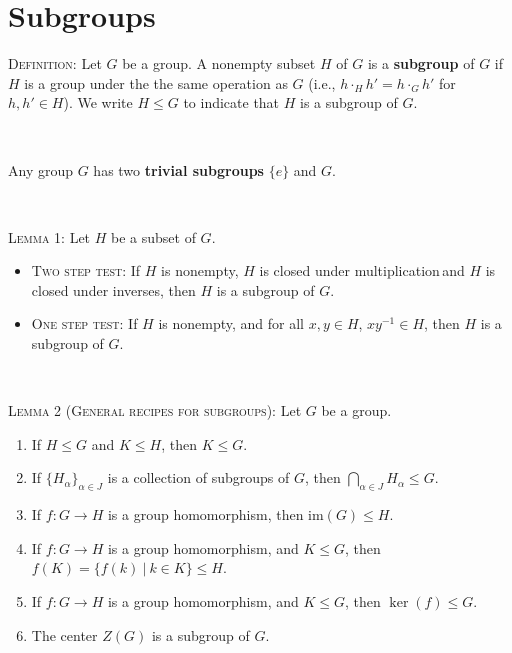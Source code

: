\documentclass[12pt]{amsart}
\newcommand{\showsol}[1]{\def\displaysol{#1}}
\begin{document}
\showsol{0}
	
	\thispagestyle{empty}
	
	\section*{Subgroups}
	
	

\begin{framed}

\textsc{Definition:} Let $G$ be a group. A nonempty subset $H$ of $G$ is a \textbf{subgroup} of $G$ if $H$ is a group under the the same operation as $G$  (i.e., $h \cdot_H h' = h \cdot_G h'$ for $h,h'\in H$). We write $H\leq G$ to indicate that $H$ is a subgroup of $G$.

\

Any group $G$ has two \textbf{trivial subgroups} $\{e\}$ and $G$.

\

\textsc{Lemma 1:} Let $H$ be a subset of $G$.
\begin{itemize}
\item \textsc{Two step test:} If $H$ is nonempty, $H$ is closed under multiplication\footnotemark\,and $H$ is closed under inverses\footnotemark[1], then $H$ is a subgroup of $G$.
\item \textsc{One step test:} If $H$ is nonempty, and for all $x,y\in H$, $xy^{-1}\in H$, then $H$ is a subgroup of $G$.
\end{itemize}

\

\textsc{Lemma 2 (General recipes for subgroups):} Let $G$ be a group.
\begin{enumerate}
\item If $H\leq  G$ and $K\leq H$, then $K\leq G$.
\item If $\{ H_{\alpha} \}_{\alpha\in J}$ is a collection of subgroups of $G$, then $\bigcap_{\alpha\in J} H_\alpha \leq G$.
\item If $f:G\to H$ is a group homomorphism, then $\mathrm{im}(G) \leq H$.
\item If $f:G\to H$ is a group homomorphism, and $K\leq G$, then $f(K) = \{ f(k) \ | \ k\in K\} \leq H$.
\item If $f:G\to H$ is a group homomorphism, and $K\leq G$, then $\ker(f) \leq G$.
\item The center $Z(G)$ is a subgroup of $G$.
\end{enumerate}


\end{framed}
\end{document}
